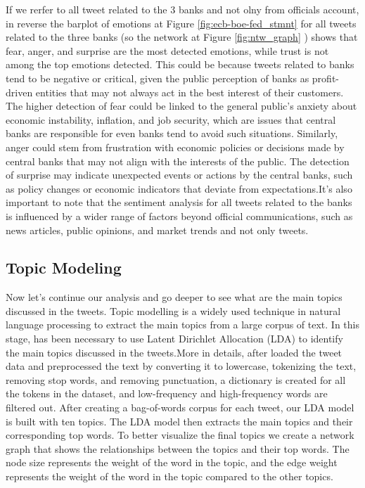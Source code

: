 \documentclass[fleqn,10pt]{SelfArx} %
\begin{document}
If we rerfer to all tweet related to the 3 banks and not olny from officials account, in reverse the barplot of emotions at Figure \ref{fig:ecb-boe-fed_stmnt} for all tweets related to the three banks (so the network at Figure \ref{fig:ntw_graph} ) shows that fear, anger, and surprise are the most detected emotions, while trust is not among the top emotions detected. This could be because tweets related to banks tend to be negative or critical, given the public perception of banks as profit-driven entities that may not always act in the best interest of their customers. The higher detection of fear could be linked to the general public's anxiety about economic instability, inflation, and job security, which are issues that central banks are responsible for even banks tend to avoid such situations. Similarly, anger could stem from frustration with economic policies or decisions made by central banks that may not align with the interests of the public. The detection of surprise may indicate unexpected events or actions by the central banks, such as policy changes or economic indicators that deviate from expectations.It's also important to note that the sentiment analysis for all tweets related to the banks is influenced by a wider range of factors beyond official communications, such as news articles, public opinions, and market trends and not only tweets. 

\subsection{Topic Modeling}

Now let's continue our analysis and go deeper to see what are the main topics discussed in the tweets. Topic modelling is a widely used technique in natural language processing to extract the main topics from a large corpus of text. In this stage,  has been necessary to use Latent Dirichlet Allocation (LDA) to identify the main topics discussed in the tweets.More in details, after loaded the tweet data and preprocessed the text by converting it to lowercase, tokenizing the text, removing stop words, and removing punctuation, a dictionary is created for all the tokens in the dataset, and low-frequency and high-frequency words are filtered out. After creating a bag-of-words corpus for each tweet, our LDA model is built with ten topics. The LDA model then extracts the main topics and their corresponding top words.  To better visualize the final topics we create a network graph that shows the relationships between the topics and their top words. The node size represents the weight of the word in the topic, and the edge weight represents the weight of the word in the topic compared to the other topics.
\end{document}
